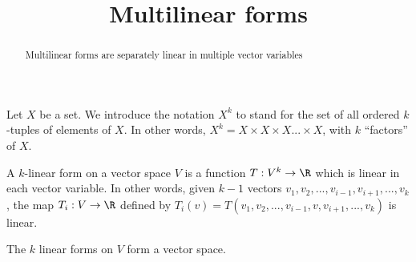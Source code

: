 \documentclass{ximera}
\title{Multilinear forms}
\begin{document}
	\begin{abstract}
		Multilinear forms are separately linear in multiple vector variables 
	\end{abstract}
	
	\begin{definition}
		Let $X$ be a set.  We introduce the notation $X^k$ to stand for the set of all ordered $k$-tuples of elements of $X$.  In other words, $X^k = X \times X \times X...\times X$, 
		 with $k$ ``factors'' of $X$.
	\end{definition}	
	
	\begin{definition}
		A $k$-linear  form on a vector space $V$ is a function $T: V^k \to \R$ which is linear in each vector variable.  In other words, given $k-1$ vectors
		 $v_1,v_2,...,v_{i-1},v_{i+1},...,v_k$, the map $T_i: V \to \R$ defined by $T_i(v) = T(v_1,v_2,...,v_{i-1},v,v_{i+1},...,v_k)$ is linear.
	\end{definition}
	
	The $k$ linear forms on $V$ form a vector space.
	
\end{document}
